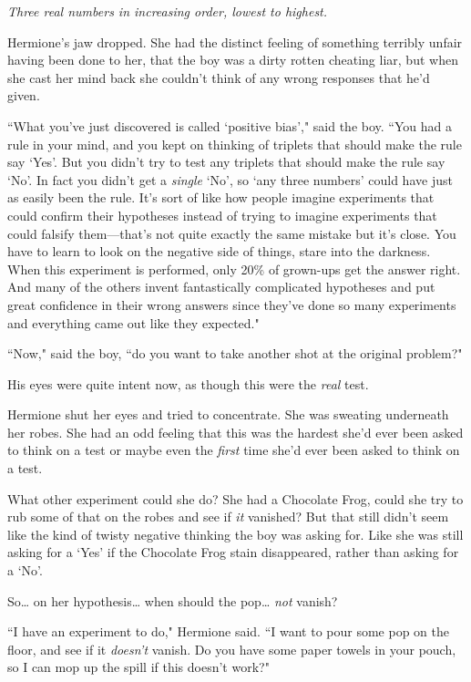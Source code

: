 \emph{Three real numbers in increasing order, lowest to highest.}

Hermione's jaw dropped. She had the distinct feeling of something terribly unfair having been done to her, that the boy was a dirty rotten cheating liar, but when she cast her mind back she couldn't think of any wrong responses that he'd given.

``What you've just discovered is called `positive bias'," said the boy. ``You had a rule in your mind, and you kept on thinking of triplets that should make the rule say `Yes'. But you didn't try to test any triplets that should make the rule say `No'. In fact you didn't get a \emph{single} `No', so `any three numbers' could have just as easily been the rule. It's sort of like how people imagine experiments that could confirm their hypotheses instead of trying to imagine experiments that could falsify them---that's not quite exactly the same mistake but it's close. You have to learn to look on the negative side of things, stare into the darkness. When this experiment is performed, only 20\% of grown-ups get the answer right. And many of the others invent fantastically complicated hypotheses and put great confidence in their wrong answers since they've done so many experiments and everything came out like they expected."

``Now," said the boy, ``do you want to take another shot at the original problem?"

His eyes were quite intent now, as though this were the \emph{real} test.

Hermione shut her eyes and tried to concentrate. She was sweating underneath her robes. She had an odd feeling that this was the hardest she'd ever been asked to think on a test or maybe even the \emph{first} time she'd ever been asked to think on a test.

What other experiment could she do? She had a Chocolate Frog, could she try to rub some of that on the robes and see if \emph{it} vanished? But that still didn't seem like the kind of twisty negative thinking the boy was asking for. Like she was still asking for a `Yes' if the Chocolate Frog stain disappeared, rather than asking for a `No'.

So{\ldots} on her hypothesis{\ldots} when should the pop{\ldots} \emph{not} vanish?

``I have an experiment to do," Hermione said. ``I want to pour some pop on the floor, and see if it \emph{doesn't} vanish. Do you have some paper towels in your pouch, so I can mop up the spill if this doesn't work?"

